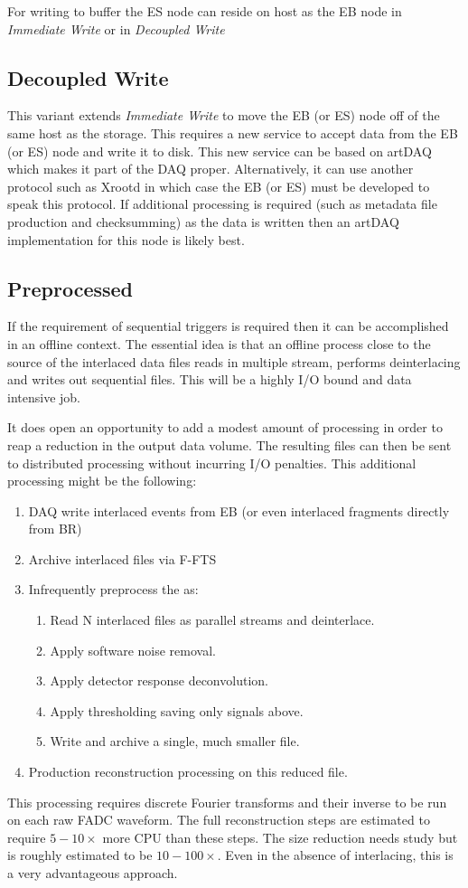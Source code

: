 \documentclass[pdftex,12pt,letter]{article}
\begin{document}
For writing to buffer the ES node can reside on host as the EB node in
\textit{Immediate Write} or in \textit{Decoupled Write}

\subsection{Decoupled Write}

This variant extends \textit{Immediate Write} to move the EB (or ES)
node off of the same host as the storage.  This requires a new service
to accept data from the EB (or ES) node and write it to disk.  This
new service can be based on artDAQ which makes it part of the DAQ
proper.  Alternatively, it can use another protocol such as Xrootd in
which case the EB (or ES) must be developed to speak this protocol.
If additional processing is required (such as metadata file production
and checksumming) as the data is written then an artDAQ implementation
for this node is likely best.

\subsection{Preprocessed}

If the requirement of sequential triggers is required then it can be
accomplished in an offline context.  The essential idea is that an
offline process close to the source of the interlaced data files reads
in multiple stream, performs deinterlacing and writes out sequential
files.  This will be a highly I/O bound and data intensive job.

It does open an opportunity to add a modest amount of processing in
order to reap a reduction in the output data volume.  The resulting
files can then be sent to distributed processing without incurring I/O
penalties.  This additional processing might be the following:

\begin{enumerate}
\item DAQ write interlaced events from EB (or even interlaced fragments directly from BR)
\item Archive interlaced files via F-FTS
\item Infrequently preprocess the as:
  \begin{enumerate}
  \item Read N interlaced files as parallel streams and deinterlace.
  \item Apply software noise removal.
  \item Apply detector response deconvolution.
  \item Apply thresholding saving only signals above.
  \item Write and archive a single, much smaller file.
  \end{enumerate}
\item Production reconstruction processing on this reduced file.
\end{enumerate}
This processing requires discrete Fourier transforms and their inverse
to be run on each raw FADC waveform.  The full reconstruction steps
are estimated to require $5-10\times$ more CPU than these steps.  The
size reduction needs study but is roughly estimated to be
$10-100\times$.  Even in the absence of interlacing, this is a very
advantageous approach.  
\end{document}
